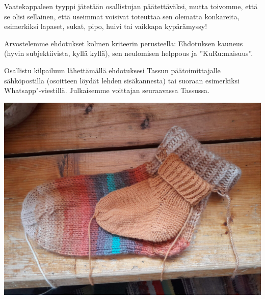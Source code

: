 Vaatekappaleen tyyppi jätetään osallistujan päätettäväksi, mutta toivomme,
että se olisi sellainen, että useimmat voisivat toteuttaa sen olematta
konkareita, esimerkiksi lapaset, sukat, pipo, huivi tai vaikkapa kypärämyssy!

Arvostelemme ehdotukset kolmen kriteerin perusteella: Ehdotuksen kauneus (hyvin subjektiivista, kyllä kyllä), sen neulomisen helppous ja \mbox{''KuRu:maisuus''}.

Osallistu kilpailuun lähettämällä ehdotuksesi Tassun päätoimittajalle
sähköpostilla (osoitteen löydät lehden sisäkannesta) tai suoraan esimerkiksi
Whatsapp"-viestillä. Julkaisemme voittajan seuraavassa Tassussa.

\vfill

\begin{center}
	\noindent\includegraphics[width=0.8\linewidth,trim={0 9cm 0 9cm},clip]{assets/neulekilpailu2}
\end{center}
